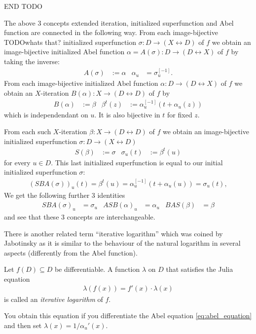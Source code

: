 \documentclass{article}
\numberwithin{equation}{section}
\begin{document}
END TODO

The above 3 concepts extended iteration, initialized superfunction and
Abel function are connected in the following way.
From each image-bijective TODO{whats that?} initialized superfunction $\sigma\colon
D\to(X\leftrightarrow D)$ of $f$ we obtain an image-bijective
initialized Abel function $\alpha = A(\sigma)\colon D\to(D\leftrightarrow
X)$ of $f$ by taking the inverse:
\begin{align*}
  A(\sigma)&:=\alpha & \alpha_u&=\sigma_u^{[-1]}.
\end{align*}
From each image-bijective initialized Abel function $\alpha\colon
D\to(D\leftrightarrow X)$ of
$f$ we obtain an $X$-iteration $B(\alpha)\colon X\to
(D\leftrightarrow D)$ of $f$
by
\begin{align*}
  B(\alpha)&:=\beta & \beta^t(z)&:=\alpha_u^{[-1]}(t+\alpha_u(z))
\end{align*}
which is independendant on $u$. It is also bijective in $t$ for fixed $z$. 

From each such $X$-iteration $\beta\colon X\to
(D\leftrightarrow D)$ of $f$ we
obtain an image-bijective initialized superfunction $\sigma\colon
D\to(X\leftrightarrow D)$
\begin{align*}
  S(\beta)&:=\sigma & \sigma_u(t)&:=\beta^t(u)
\end{align*}
for every $u\in D$. This last initialized superfunction is equal
to our initial initialized superfunction $\sigma$:
\begin{align*}
  (S B A(\sigma))_u(t) = \beta^t(u) = \alpha_u^{[-1]}(t+\alpha_u(u)) =
  \sigma_u(t), 
\end{align*}
We get the following further 3 identities
\begin{align*}
  S B A (\sigma)_u &= \sigma_u & A S B (\alpha)_u &= \alpha_u & B A S (\beta) &= \beta
\end{align*}
and see that these 3 concepts are interchangeable.

There is another related term ``iterative logarithm'' which was coined
by Jabotinsky \cite{Jabotinsky:Analytic} as it is similar to the behaviour of the natural
logarithm in several aspects (differently from the Abel function).

\begin{definition}\label{def:julia_equation}
Let $f(D)\subseteq D$ be differentiable. A function $\lambda$ on $D$ that
satisfies the Julia equation
\begin{align}
  \lambda(f(x)) = f'(x)\cdot \lambda(x)\label{eq:julia_equation}
\end{align}
is called an {\em iterative logarithm} of $f$.
\end{definition}
You obtain this equation if you differentiate the Abel equation
\eqref{eq:abel_equation} and then set $\lambda(x)=1/\alpha_u'(x)$. 
\end{document}
